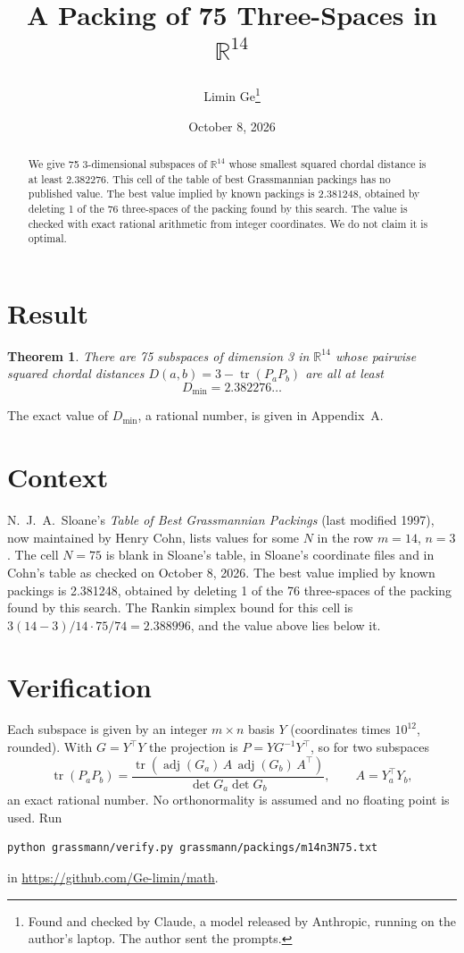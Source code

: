 \documentclass[11pt,a4paper]{article}
\title{A Packing of 75 Three-Spaces in $\mathbb{R}^{14}$}
\author{Limin Ge\thanks{Found and checked by Claude, a model released by Anthropic, running on the author's laptop. The author sent the prompts.}}
\date{October 8, 2026}
\newtheorem*{theorem}{Theorem}
\begin{document}
\maketitle
\begin{abstract}
We give 75 3-dimensional subspaces of $\mathbb{R}^{14}$ whose smallest squared chordal distance is at least 2.382276. This cell of the table of best Grassmannian packings has no published value. The best value implied by known packings is 2.381248, obtained by deleting 1 of the 76 three-spaces of the packing found by this search. The value is checked with exact rational arithmetic from integer coordinates. We do not claim it is optimal.
\end{abstract}

\section{Result}
\begin{theorem}
There are 75 subspaces of dimension 3 in $\mathbb{R}^{14}$ whose pairwise squared chordal distances $D(a,b) = 3 - \operatorname{tr}(P_aP_b)$ are all at least
\[ D_{\min} = 2.382276\ldots \]
\end{theorem}
The exact value of $D_{\min}$, a rational number, is given in Appendix~A.


\section{Context}
N.~J.~A.~Sloane's \emph{Table of Best Grassmannian Packings} (last modified 1997), now maintained by Henry Cohn, lists values for some $N$ in the row $m=14$, $n=3$. The cell $N=75$ is blank in Sloane's table, in Sloane's coordinate files and in Cohn's table as checked on October 8, 2026. The best value implied by known packings is 2.381248, obtained by deleting 1 of the 76 three-spaces of the packing found by this search. The Rankin simplex bound for this cell is $3(14-3)/14\cdot 75/74 = 2.388996$, and the value above lies below it.


\section{Verification}
Each subspace is given by an integer $m\times n$ basis $Y$ (coordinates times $10^{12}$, rounded). With $G=Y^\top Y$ the projection is $P=YG^{-1}Y^\top$, so for two subspaces
\[ \operatorname{tr}(P_aP_b)=\frac{\operatorname{tr}(\operatorname{adj}(G_a)\,A\,\operatorname{adj}(G_b)\,A^\top)}{\det G_a\det G_b},\qquad A=Y_a^\top Y_b, \]
an exact rational number. No orthonormality is assumed and no floating point is used. Run
\begin{verbatim}
python grassmann/verify.py grassmann/packings/m14n3N75.txt
\end{verbatim}
in \url{https://github.com/Ge-limin/math}.
\end{document}
